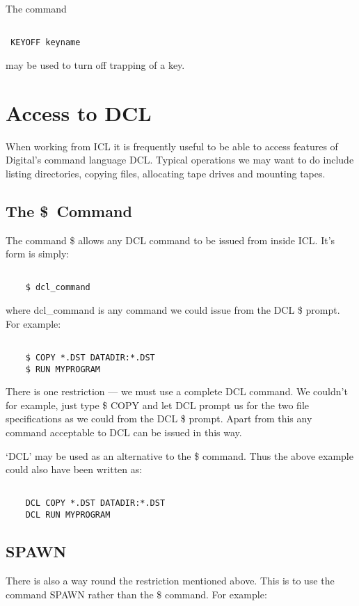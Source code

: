 The command
\begin{verbatim}

 KEYOFF keyname

\end{verbatim}
 may be used to turn off trapping of a key.
    

\chapter{Access to DCL}
When working from ICL it is frequently useful to be able to access features of
Digital's command language DCL. 
Typical operations we may want to do include listing directories, copying
files, allocating tape drives and mounting tapes.

\section{The \$\ Command}
The command \$ allows any DCL command to be issued from inside ICL. It's
form is simply:
\begin{verbatim}

    $ dcl_command

\end{verbatim}
where dcl\_command is any command we could issue from the DCL \$ prompt.
For example:

\begin{verbatim}

    $ COPY *.DST DATADIR:*.DST
    $ RUN MYPROGRAM

\end{verbatim}
There is one restriction --- we must use a complete DCL command. We couldn't
for example, just type \$ COPY and let DCL prompt us for the two file
specifications as we could from the DCL \$ prompt. Apart from this any
command acceptable to DCL can be issued in this way.

`DCL' may be used as an alternative to the \$ command. Thus the
above example could also have been written as:

\begin{verbatim}

    DCL COPY *.DST DATADIR:*.DST
    DCL RUN MYPROGRAM

\end{verbatim}

\section{SPAWN}
There is also a way round the restriction mentioned above. This is to 
use the command SPAWN rather than the \$ command. For example:

